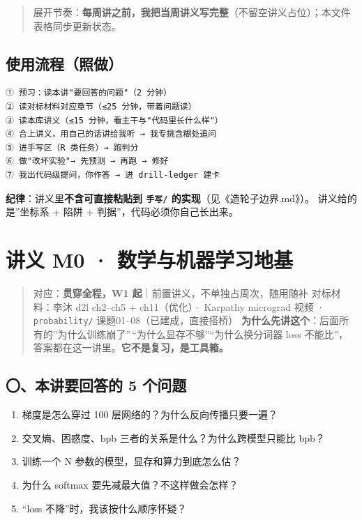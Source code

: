\documentclass[
  chinese,
  11pt,
]{ctexart}
\providecommand{\tightlist}{%
  \setlength{\itemsep}{0pt}\setlength{\parskip}{0pt}}
\begin{document}
\begin{quote}
展开节奏：\textbf{每周讲之前，我把当周讲义写完整}（不留空讲义占位）；本文件表格同步更新状态。
\end{quote}

\subsection{使用流程（照做）}\label{ux4f7fux7528ux6d41ux7a0bux7167ux505a}

\begin{verbatim}
① 预习：读本讲"要回答的问题"（2 分钟）
② 读对标材料对应章节（≤25 分钟，带着问题读）
③ 读本库讲义（≤15 分钟，看主干与"代码里长什么样"）
④ 合上讲义，用自己的话讲给我听 → 我专挑含糊处追问
⑤ 进手写区（R 类任务）→ 跑判分
⑥ 做"改坏实验"→ 先预测 → 再跑 → 修好
⑦ 我出代码级提问，你作答 → 进 drill-ledger 建卡
\end{verbatim}

\textbf{纪律}：讲义里\textbf{不含可直接粘贴到 \texttt{手写/} 的实现}（见《造轮子边界.md》）。 讲义给的是''坐标系 + 陷阱 + 判据''，代码必须你自己长出来。

\newpage

\section{讲义 M0 · 数学与机器学习地基}\label{ux8bb2ux4e49-m0-ux6570ux5b66ux4e0eux673aux5668ux5b66ux4e60ux5730ux57fa}

\begin{quote}
对应：\textbf{贯穿全程，W1 起}｜前置讲义，不单独占周次，随用随补 对标材料：李沐 d2l ch2--ch5 + ch11（优化）· Karpathy micrograd 视频 · \texttt{probability/} 课题01--08（已建成，直接搭桥） \textbf{为什么先讲这个}：后面所有的''为什么训练崩了''\,``为什么显存不够''``为什么换分词器 loss 不能比''， 答案都在这一讲里。\textbf{它不是复习，是工具箱。}
\end{quote}

\subsection{〇、本讲要回答的 5 个问题}\label{ux672cux8bb2ux8981ux56deux7b54ux7684-5-ux4e2aux95eeux9898}

\begin{enumerate}
\def\labelenumi{\arabic{enumi}.}
\tightlist
\item
  梯度是怎么穿过 100 层网络的？为什么反向传播只要一遍？
\item
  交叉熵、困惑度、bpb 三者的关系是什么？为什么跨模型只能比 bpb？
\item
  训练一个 N 参数的模型，显存和算力到底怎么估？
\item
  为什么 softmax 要先减最大值？不这样做会怎样？
\item
  ``loss 不降''时，我该按什么顺序怀疑？
\end{enumerate}
\end{document}
